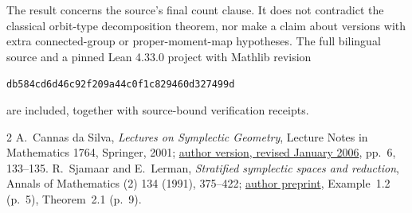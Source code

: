 \documentclass[11pt,a4paper]{article}
\begin{document}
The result concerns the source's final count clause. It does not
contradict the classical orbit-type decomposition theorem, nor make a
claim about versions with extra connected-group or proper-moment-map
hypotheses. The full bilingual source and a pinned Lean 4.33.0 project
with Mathlib revision
\begin{center}\small
\texttt{db584cd6d46c92f209a44c0f1c829460d327499d}
\end{center}
are included, together with source-bound verification receipts.

\begin{thebibliography}{2}
A.~Cannas da Silva, \emph{Lectures on Symplectic Geometry},
Lecture Notes in Mathematics 1764, Springer, 2001;
\href{https://people.math.ethz.ch/~acannas/Papers/lsg.pdf}{author version,
revised January 2006}, pp.~6, 133--135.
R.~Sjamaar and E.~Lerman, \emph{Stratified symplectic spaces and reduction},
Annals of Mathematics (2) 134 (1991), 375--422;
\href{https://people.maths.ox.ac.uk/beem/papers/symplectic_stratified_spaces.pdf}{author preprint},
Example~1.2 (p.~5), Theorem~2.1 (p.~9).
\end{thebibliography}
\end{document}
